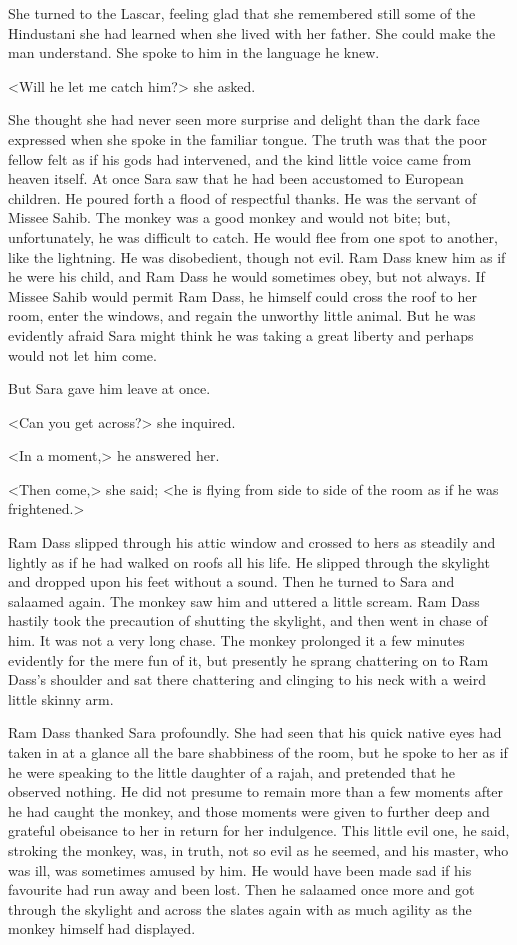 She turned to the Lascar, feeling glad that she remembered still some of the Hindustani she had learned when she lived with her father. She could make the man understand. She spoke to him in the language he knew.

<Will he let me catch him?> she asked.

She thought she had never seen more surprise and delight than the dark face expressed when she spoke in the familiar tongue. The truth was that the poor fellow felt as if his gods had intervened, and the kind little voice came from heaven itself. At once Sara saw that he had been accustomed to European children. He poured forth a flood of respectful thanks. He was the servant of Missee Sahib. The monkey was a good monkey and would not bite; but, unfortunately, he was difficult to catch. He would flee from one spot to another, like the lightning. He was disobedient, though not evil. Ram Dass knew him as if he were his child, and Ram Dass he would sometimes obey, but not always. If Missee Sahib would permit Ram Dass, he himself could cross the roof to her room, enter the windows, and regain the unworthy little animal. But he was evidently afraid Sara might think he was taking a great liberty and perhaps would not let him come.

But Sara gave him leave at once.

<Can you get across?> she inquired.

<In a moment,> he answered her.

<Then come,> she said; <he is flying from side to side of the room as if he was frightened.>

Ram Dass slipped through his attic window and crossed to hers as steadily and lightly as if he had walked on roofs all his life. He slipped through the skylight and dropped upon his feet without a sound. Then he turned to Sara and salaamed again. The monkey saw him and uttered a little scream. Ram Dass hastily took the precaution of shutting the skylight, and then went in chase of him. It was not a very long chase. The monkey prolonged it a few minutes evidently for the mere fun of it, but presently he sprang chattering on to Ram Dass's shoulder and sat there chattering and clinging to his neck with a weird little skinny arm.

Ram Dass thanked Sara profoundly. She had seen that his quick native eyes had taken in at a glance all the bare shabbiness of the room, but he spoke to her as if he were speaking to the little daughter of a rajah, and pretended that he observed nothing. He did not presume to remain more than a few moments after he had caught the monkey, and those moments were given to further deep and grateful obeisance to her in return for her indulgence. This little evil one, he said, stroking the monkey, was, in truth, not so evil as he seemed, and his master, who was ill, was sometimes amused by him. He would have been made sad if his favourite had run away and been lost. Then he salaamed once more and got through the skylight and across the slates again with as much agility as the monkey himself had displayed.

